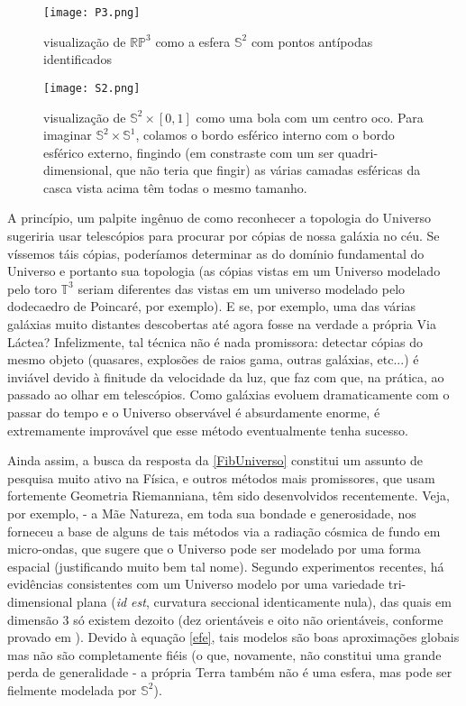 \begin{figure}[H]
\centering
\texttt{[image: P3.png]}
\caption{visualização de $\mathbb{R}\mathbb{P}^3$ como a esfera $\mathbb{S}^2$ com pontos antípodas identificados}
\end{figure}

\begin{figure}[H]
\centering
\texttt{[image: S2.png]}
\caption{visualização de $\mathbb{S}^2 \times [0, 1]$ como uma bola com um centro oco. Para imaginar $\mathbb{S}^2 \times \mathbb{S}^1$, colamos o bordo esférico interno com o bordo esférico externo, fingindo (em constraste com um ser quadri-dimensional, que não teria que fingir) as várias camadas esféricas da casca vista acima têm todas o mesmo tamanho.}
\end{figure}

A princípio, um palpite ingênuo de como reconhecer a topologia do Universo sugeriria usar telescópios para procurar por cópias de nossa galáxia no céu. Se víssemos táis cópias, poderíamos determinar as  do domínio fundamental do Universo e portanto sua topologia (as cópias vistas em um Universo modelado pelo toro $\mathbb{T}^3$ seriam diferentes das vistas em um universo modelado pelo dodecaedro de Poincaré, por exemplo). E se, por exemplo, uma das várias galáxias muito distantes descobertas até agora fosse na verdade a própria Via Láctea? Infelizmente, tal técnica não é nada promissora: detectar cópias do mesmo objeto (quasares, explosões de raios gama, outras galáxias, etc...) é inviável devido à finitude da velocidade da luz, que faz com que, na prática,  ao passado ao olhar em telescópios. Como galáxias evoluem dramaticamente com o passar do tempo e o Universo observável é absurdamente enorme, é extremamente improvável que esse método eventualmente tenha sucesso. \par 
Ainda assim, a busca da resposta da \cref{FibUniverso} constitui um assunto de pesquisa muito ativo na Física, e outros métodos mais promissores, que usam fortemente Geometria Riemanniana, têm sido desenvolvidos recentemente. Veja, por exemplo,  - a Mãe Natureza, em toda sua bondade e generosidade, nos forneceu a base de alguns de tais métodos via a radiação cósmica de fundo em micro-ondas, que sugere que o Universo pode ser modelado por uma forma espacial (justificando muito bem tal nome). Segundo experimentos recentes, há evidências consistentes com um Universo modelo por uma variedade tri-dimensional plana (\emph{id est}, curvatura seccional identicamente nula), das quais em dimensão $3$ só existem dezoito (dez orientáveis e oito não orientáveis, conforme provado em ). Devido à equação \cref{efe}, tais modelos são boas aproximações globais mas não são completamente fiéis (o que, novamente, não constitui uma grande perda de generalidade - a própria Terra também não é uma esfera, mas pode ser fielmente modelada por $\mathbb{S}^2$). 




